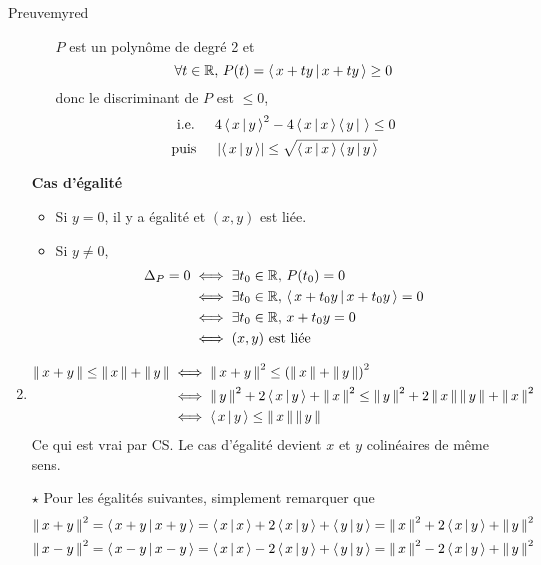 \begin{demo}{Preuve}{myred}
\begin{enumerate}[label=\textcolor{myred}{\textbf{(\alph*)}}]
\begin{itemize}
                    $P$ est un polynôme de degré 2 et
                    \[ \forall t \in \mathbb{R}, \, P(t) = \left<\,x+ty\,\middle|\,x+ty\,\right> \geq 0\] 
                    donc le discriminant de $P$ est $\leq 0$, 
                    \begin{align*}
                        \text{i.e. } \quad & 4\left<\,x\,\middle|\,y\,\right>^2-4\left<\,x\,\middle|\,x\,\right>\left<\,y\,\middle|\,\,\right> \leq 0 \\
                        \text{puis } \quad & \left\lvert \left<\,x\,\middle|\,y\,\right>\right\rvert \leq \sqrt{\left<\,x\,\middle|\,x\,\right> \left<\,y\,\middle|\,y\,\right>}
                    \end{align*}
                \end{itemize}
                \textbf{\textcolor{myred}{Cas d’égalité}}
                \begin{itemize}
                    \item Si $y = 0$, il y a égalité et $(x,y)$ est liée.
                    \item Si $y \neq 0$, 
                    \begin{align*}
                        \Delta_P = 0 & \iff \exists t_0 \in \mathbb{R}, \, P(t_0) = 0 \\
                        & \iff \exists t_0 \in \mathbb{R}, \, \left<\,x + t_0 y\,\middle|\,x + t_0 y\,\right> = 0 \\
                        & \iff \exists t_0 \in \mathbb{R}, \,x + t_0 y = 0 \\
                        & \iff (x,y) \text{ est liée}
                    \end{align*}
                \end{itemize}
                \item \begin{align*}
                    \left\lVert\,x + y\,\right\rVert \leq \left\lVert\,x\,\right\rVert + \left\lVert\,y\,\right\rVert 
                    &\iff \left\lVert\,x+y\,\right\rVert^2 \leq \left(\left\lVert\,x\,\right\rVert + \left\lVert\,y\,\right\rVert\right)^2 \\
                    &\iff \left\lVert\,y\,\right\rVert^2 + 2 \left<\,x\,\middle|\,y\,\right> + \left\lVert\,x\,\right\rVert^2 \leq \left\lVert\,y\,\right\rVert^2 + 2 \left\lVert\,x\,\right\rVert\left\lVert\,y\,\right\rVert + \left\lVert\,x\,\right\rVert^2 \\
                    &\iff \left<\,x\,\middle|\,y\,\right> \leq \left\lVert\,x\,\right\rVert\left\lVert\,y\,\right\rVert
                \end{align*}
                Ce qui est vrai par CS. Le cas d’égalité devient $x$ et $y$ colinéaires de même sens.
                \item[$\star$] Pour les égalités suivantes, simplement remarquer que 
                \begin{align*}
                    \left\lVert\,x+y\,\right\rVert^2 &= \left<\,x+y\,\middle|\,x+y\,\right> = \left<\,x\,\middle|\,x\,\right> + 2\left<\,x\,\middle|\,y\,\right> + \left<\,y\,\middle|\,y\,\right> = \left\lVert\,x\,\right\rVert^2 + 2\left<\,x\,\middle|\,y\,\right> + \left\lVert\,y\,\right\rVert^2 \\
                    \left\lVert\,x-y\,\right\rVert^2 &= \left<\,x-y\,\middle|\,x-y\,\right> = \left<\,x\,\middle|\,x\,\right> - 2\left<\,x\,\middle|\,y\,\right> + \left<\,y\,\middle|\,y\,\right> = \left\lVert\,x\,\right\rVert^2 - 2\left<\,x\,\middle|\,y\,\right> + \left\lVert\,y\,\right\rVert^2
                \end{align*}     
            \end{enumerate}
        \end{demo}

